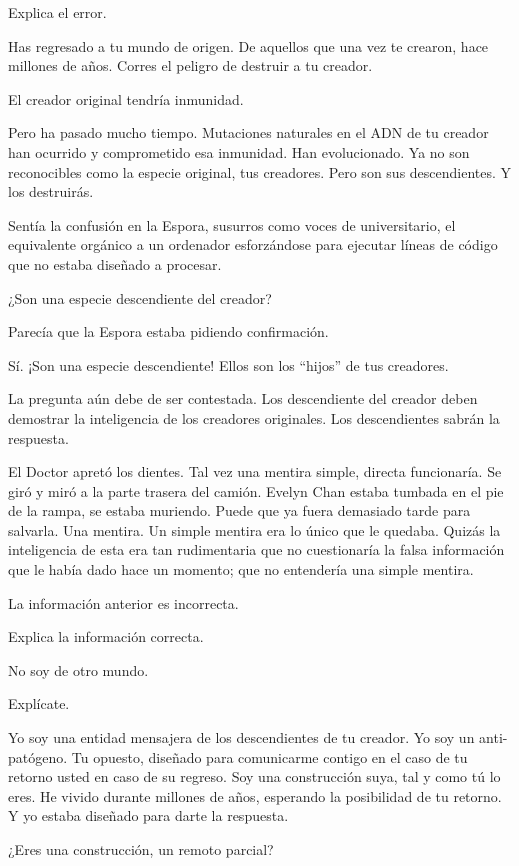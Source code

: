 Explica el error.

Has regresado a tu mundo de origen. De aquellos que una vez te crearon,
hace millones de años. Corres el peligro de destruir a tu creador.

El creador original tendría inmunidad.

Pero ha pasado mucho tiempo. Mutaciones naturales en el ADN de tu
creador han ocurrido y comprometido esa inmunidad. Han evolucionado. Ya
no son reconocibles como la especie original, tus creadores. Pero son
sus descendientes. Y los destruirás.

Sentía la confusión en la Espora, susurros como voces de universitario,
el equivalente orgánico a un ordenador esforzándose para ejecutar líneas
de código que no estaba diseñado a procesar.

¿Son una especie descendiente del creador?

Parecía que la Espora estaba pidiendo confirmación.

Sí. ¡Son una especie descendiente! Ellos son los ``hijos'' de tus
creadores.

La pregunta aún debe de ser contestada. Los descendiente del creador
deben demostrar la inteligencia de los creadores originales. Los
descendientes sabrán la respuesta.

El Doctor apretó los dientes. Tal vez una mentira simple, directa
funcionaría. Se giró y miró a la parte trasera del camión. Evelyn Chan
estaba tumbada en el pie de la rampa, se estaba muriendo. Puede que ya
fuera demasiado tarde para salvarla. Una mentira. Un simple mentira era
lo único que le quedaba. Quizás la inteligencia de esta era tan
rudimentaria que no cuestionaría la falsa información que le había dado
hace un momento; que no entendería una simple mentira.

La información anterior es incorrecta.

Explica la información correcta.

No soy de otro mundo.

Explícate.

Yo soy una entidad mensajera de los descendientes de tu creador. Yo soy
un anti-patógeno. Tu opuesto, diseñado para comunicarme contigo en el
caso de tu retorno usted en caso de su regreso. Soy una construcción
suya, tal y como tú lo eres. He vivido durante millones de años,
esperando la posibilidad de tu retorno. Y yo estaba diseñado para darte
la respuesta.

¿Eres una construcción, un remoto parcial?

